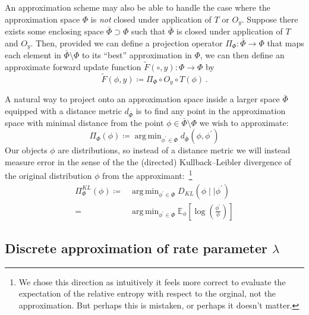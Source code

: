 \documentclass[twoside, 11pt]{article}
\DeclareMathOperator*{\argmin}{arg\,min}
\begin{document}
An approximation scheme may also be able to handle the case where the approximation space $\Phi$ is \emph{not} closed under application of $T$ or $O_y$. Suppose there exists some enclosing space $\bar{\Phi} \supset \Phi$ such that $\bar{\Phi}$ is closed under application of $T$ and $O_y$. Then, provided we can define a projection operator $\Pi_{\Phi} : \bar{\Phi} \rightarrow \Phi$ that maps each element in $\bar{\Phi} \setminus \Phi$ to its ``best'' approximation in $\Phi$, we can then define an approximate forward update function $\tilde{F}(\circ, y): \Phi \rightarrow \Phi$ by
\begin{equation}
\tilde{F}(\phi, y) \coloneqq \Pi_{\Phi} \circ O_{y} \circ T (\phi) \, .
\end{equation}

A natural way to project onto an approximation space inside a larger space $\bar{\Phi}$ equipped with a distance metric $d_{\bar{\Phi}}$ is to find any point in the approximation space with minimal distance from the point $\phi \in \bar{\Phi} \setminus \Phi$ we wish to approximate:
\begin{equation}
\Pi_{\Phi}(\phi)
\coloneqq
\argmin_{\phi^{\prime} \in \Phi } d_{\bar{\Phi}}(\phi, \phi^{\prime})
\end{equation}
Our objects $\phi$ are distributions, so instead of a distance metric we will instead measure error in the sense of the the (directed) Kullback–Leibler divergence of the original distribution $\phi$ from the approximant:~\footnote{
We chose this direction as intuitively it feels more correct to evaluate the expectation of the relative entropy with respect to the orginal, not the approximation. But perhaps this is mistaken, or perhaps it doesn't matter.}
\begin{align}
\Pi^{KL}_{\Phi}(\phi)
\coloneqq &
\argmin_{\phi^{\prime} \in \Phi } D_{KL}(\phi \mid \mid \phi^{\prime}) \\
 = & \argmin_{\phi^{\prime} \in \Phi } \mathbb{E}_{\phi} \left[ \log \left( \frac{ \phi^{\prime}}{ \phi } \right) \right]
\end{align}



\subsection{Discrete approximation of rate parameter $\lambda$}
\end{document}
